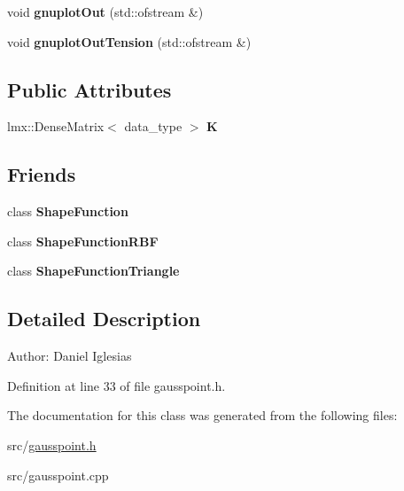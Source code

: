 \begin{CompactItemize}
\item 
\hypertarget{classmknix_1_1GaussPoint_ace5b71a7f742b6ba8328b7cbd2c333d}{
void \textbf{gnuplotOut} (std::ofstream \&)}
\label{classmknix_1_1GaussPoint_ace5b71a7f742b6ba8328b7cbd2c333d}

\item 
\hypertarget{classmknix_1_1GaussPoint_4d1b3480c2d87c450740f25cb3a1eef6}{
void \textbf{gnuplotOutTension} (std::ofstream \&)}
\label{classmknix_1_1GaussPoint_4d1b3480c2d87c450740f25cb3a1eef6}

\end{CompactItemize}
\subsection*{Public Attributes}
\begin{CompactItemize}
\item 
\hypertarget{classmknix_1_1GaussPoint_e7978e2c7f9e6289a137e3da640f7c09}{
lmx::DenseMatrix$<$ data\_\-type $>$ \textbf{K}}
\label{classmknix_1_1GaussPoint_e7978e2c7f9e6289a137e3da640f7c09}

\end{CompactItemize}
\subsection*{Friends}
\begin{CompactItemize}
\item 
\hypertarget{classmknix_1_1GaussPoint_65b2654dc4464f92687e22eb5a247f20}{
class \textbf{ShapeFunction}}
\label{classmknix_1_1GaussPoint_65b2654dc4464f92687e22eb5a247f20}

\item 
\hypertarget{classmknix_1_1GaussPoint_d76d1b525e65d47484187892160efd74}{
class \textbf{ShapeFunctionRBF}}
\label{classmknix_1_1GaussPoint_d76d1b525e65d47484187892160efd74}

\item 
\hypertarget{classmknix_1_1GaussPoint_64bc125443b7c740a25d032c8294c4db}{
class \textbf{ShapeFunctionTriangle}}
\label{classmknix_1_1GaussPoint_64bc125443b7c740a25d032c8294c4db}

\end{CompactItemize}


\subsection{Detailed Description}
\begin{Desc}
\item[Author:]Daniel Iglesias \end{Desc}


Definition at line 33 of file gausspoint.h.

The documentation for this class was generated from the following files:\begin{CompactItemize}
\item 
src/\hyperlink{gausspoint_8h}{gausspoint.h}\item 
src/gausspoint.cpp\end{CompactItemize}
